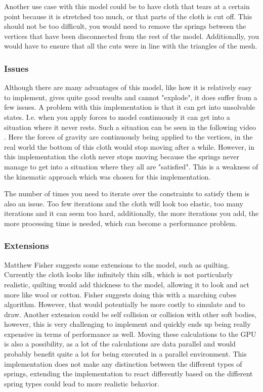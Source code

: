 Another use case with this model could be to have cloth that tears at a certain point because it is stretched too much,
or that parts of the cloth is cut off. This should not be too difficult, you would need to remove the springs between
the vertices that have been disconnected from the rest of the model.
Additionally, you would have to ensure that all the cuts were in line with the triangles of the mesh.

\subsubsection{Issues}
Although there are many advantages of this model, like how it is relatively easy to implement, gives quite good results and cannot "explode", it does suffer from a few issues.
A problem with this implementation is that it can get into unsolvable states.
I.e. when you apply forces to model continuously it can get into a situation where it never rests.
Such a situation can be seen in the following video .
Here the forces of gravity are continuously being applied to the vertices, in the real world the bottom
of this cloth would stop moving after a while. However, in this implementation the cloth never stops moving
because the springs never manage to get into a situation where they all are "satisfied".
This is a weakness of the kinematic approach which was chosen for this implementation\cite{math_for_games}.

The number of times you need to iterate over the constraints to satisfy them is also an issue.
Too few iterations and the cloth will look too elastic, too many iterations and it can seem too hard,
additionally, the more iterations you add, the more processing time is needed, which can become a performance problem.

\subsubsection{Extensions}
Matthew Fisher\cite{matthew_fisher} suggests some extensions to the model,
such as quilting. Currently the cloth looks like infinitely thin silk, which is not particularly realistic,
quilting would add thickness to the model, allowing it to look and act more like wool or cotton. 
Fisher suggests doing this with a marching cubes algorithm.
However, that would potentially be more costly to simulate and to draw.
Another extension could be self collision or collision with other soft bodies, however, this is very challenging to implement
and quickly ends up being really expensive in terms of performance as well.
Moving these calculations to the GPU is also a possibility, as a lot of the calculations are data parallel and would probably benefit quite a lot for being executed in a parallel environment.
This implementation does not make any distinction between the different types of springs, extending the implementation to react differently based on the different spring types could lead to more realistic behavior.

